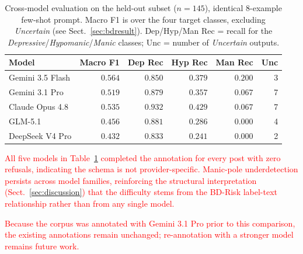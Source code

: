 \documentclass[runningheads]{llncs}
\newcommand{\rev}[1]{\textcolor{red}{#1}}
\newcommand{\revfloat}{\color{red}}
\newcommand{\rev}[1]{#1}
\newcommand{\revfloat}{}
\begin{document}
\begin{table}[t]\revfloat
\caption{Cross-model evaluation on the held-out subset ($n = 145$), identical 8-example few-shot prompt. Macro F1 is over the four target classes, excluding \emph{Uncertain} (see Sect.~\ref{sec:bdresult}). Dep/Hyp/Man Rec = recall for the \emph{Depressive}/\emph{Hypomanic}/\emph{Manic} classes; Unc = number of \emph{Uncertain} outputs.}
\label{tab:crossmodel}
\centering
\setlength{\tabcolsep}{5pt}
\begin{tabular}{lrrrrr}
\toprule
\textbf{Model} & \textbf{Macro F1} & \textbf{Dep Rec} & \textbf{Hyp Rec} & \textbf{Man Rec} & \textbf{Unc} \\
\midrule
Gemini 3.5 Flash & $\mathbf{0.564}$ & $0.850$ & $0.379$ & $0.200$ & 3 \\
Gemini 3.1 Pro & $0.519$ & $0.879$ & $0.357$ & $0.067$ & 7 \\
Claude Opus 4.8 & $0.535$ & $0.932$ & $0.429$ & $0.067$ & 7 \\
GLM-5.1 & $0.456$ & $0.881$ & $0.286$ & $0.000$ & 4 \\
DeepSeek V4 Pro & $0.432$ & $0.833$ & $0.241$ & $0.000$ & 2 \\
\bottomrule
\end{tabular}
\end{table}

\rev{All five models in Table~\ref{tab:crossmodel} completed the annotation for every post with zero refusals, indicating the schema is not provider-specific. Manic-pole underdetection persists across model families, reinforcing the structural interpretation (Sect.~\ref{sec:discussion}) that the difficulty stems from the BD-Risk label-text relationship rather than from any single model.}

\rev{Because the corpus was annotated with Gemini 3.1 Pro prior to this comparison, the existing annotations remain unchanged; re-annotation with a stronger model remains future work.}
\end{document}
